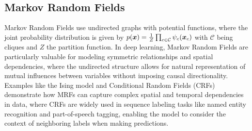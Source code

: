 \subsection{Markov Random Fields}

Markov Random Fields use undirected graphs with potential functions, where the joint probability distribution is given by $p(\boldsymbol{x}) = \frac{1}{Z} \prod_{c \in \mathcal{C}} \psi_c(\boldsymbol{x}_c)$ with $\mathcal{C}$ being cliques and $Z$ the partition function. In deep learning, Markov Random Fields are particularly valuable for modeling symmetric relationships and spatial dependencies, where the undirected structure allows for natural representation of mutual influences between variables without imposing causal directionality. Examples like the Ising model and Conditional Random Fields (CRFs) demonstrate how MRFs can capture complex spatial and temporal dependencies in data, where CRFs are widely used in sequence labeling tasks like named entity recognition and part-of-speech tagging, enabling the model to consider the context of neighboring labels when making predictions.






